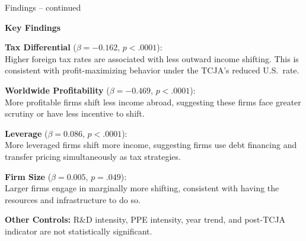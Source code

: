 \documentclass{beamer}
\begin{document}
\begin{frame}{Findings -- continued}
\centerline{\large\textbf{Key Findings}}
\vspace{0.2cm}
{\small
\textbf{Tax Differential} ($\beta = -0.162$, $p < .0001$): \\
Higher foreign tax rates are associated with less outward income shifting. This is consistent with profit-maximizing behavior under the TCJA's reduced U.S.\ rate.

\vspace{0.2cm}
\textbf{Worldwide Profitability} ($\beta = -0.469$, $p < .0001$): \\
More profitable firms shift less income abroad, suggesting these firms face greater scrutiny or have less incentive to shift.

\vspace{0.2cm}
\textbf{Leverage} ($\beta = 0.086$, $p < .0001$): \\
More leveraged firms shift more income, suggesting firms use debt financing and transfer pricing simultaneously as tax strategies.

\vspace{0.2cm}
\textbf{Firm Size} ($\beta = 0.005$, $p = .049$): \\
Larger firms engage in marginally more shifting, consistent with having the resources and infrastructure to do so.

\vspace{0.2cm}
\textbf{Other Controls:} R\&D intensity, PPE intensity, year trend, and post-TCJA indicator are not statistically significant.
}
\end{frame}
\end{document}
